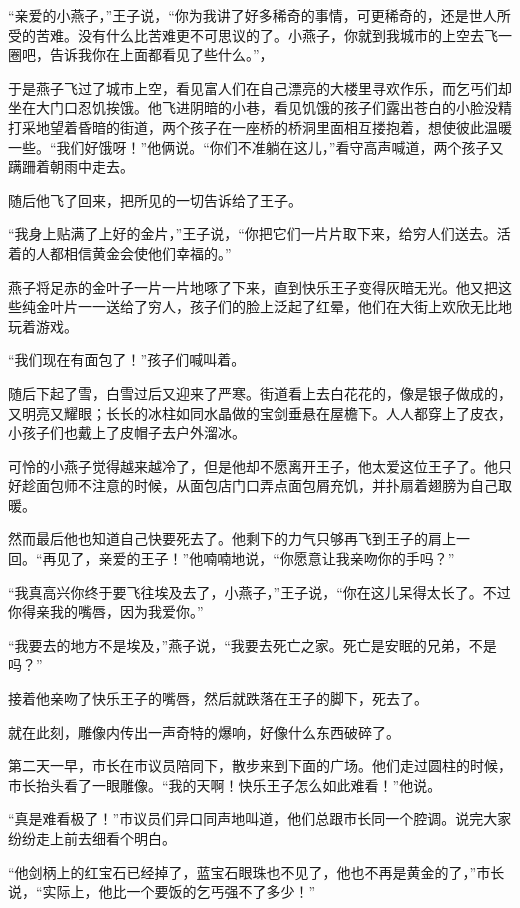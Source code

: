 \documentclass[12pt,UTF-8,openany]{ctexbook}
\begin{document}
\begin{normalsize}
    “亲爱的小燕子，”王子说，“你为我讲了好多稀奇的事情，可更稀奇的，还是世人所受的苦难。没有什么比苦难更不可思议的了。小燕子，你就到我城市的上空去飞一圈吧，告诉我你在上面都看见了些什么。”，
    
    于是燕子飞过了城市上空，看见富人们在自己漂亮的大楼里寻欢作乐，而乞丐们却坐在大门口忍饥挨饿。他飞进阴暗的小巷，看见饥饿的孩子们露出苍白的小脸没精打采地望着昏暗的街道，两个孩子在一座桥的桥洞里面相互搂抱着，想使彼此温暖一些。“我们好饿呀！”他俩说。“你们不准躺在这儿，”看守高声喊道，两个孩子又蹒跚着朝雨中走去。
    
    随后他飞了回来，把所见的一切告诉给了王子。
    
    “我身上贴满了上好的金片，”王子说，“你把它们一片片取下来，给穷人们送去。活着的人都相信黄金会使他们幸福的。”
    
    燕子将足赤的金叶子一片一片地啄了下来，直到快乐王子变得灰暗无光。他又把这些纯金叶片一一送给了穷人，孩子们的脸上泛起了红晕，他们在大街上欢欣无比地玩着游戏。
    
    “我们现在有面包了！”孩子们喊叫着。
    
    随后下起了雪，白雪过后又迎来了严寒。街道看上去白花花的，像是银子做成的，又明亮又耀眼；长长的冰柱如同水晶做的宝剑垂悬在屋檐下。人人都穿上了皮衣，小孩子们也戴上了皮帽子去户外溜冰。
    
    可怜的小燕子觉得越来越冷了，但是他却不愿离开王子，他太爱这位王子了。他只好趁面包师不注意的时候，从面包店门口弄点面包屑充饥，并扑扇着翅膀为自己取暖。
    
    然而最后他也知道自己快要死去了。他剩下的力气只够再飞到王子的肩上一回。“再见了，亲爱的王子！”他喃喃地说，“你愿意让我亲吻你的手吗？”
    
    “我真高兴你终于要飞往埃及去了，小燕子，”王子说，“你在这儿呆得太长了。不过你得亲我的嘴唇，因为我爱你。”
    
    “我要去的地方不是埃及，”燕子说，“我要去死亡之家。死亡是安眠的兄弟，不是吗？”
    
    接着他亲吻了快乐王子的嘴唇，然后就跌落在王子的脚下，死去了。
    
    就在此刻，雕像内传出一声奇特的爆响，好像什么东西破碎了。
    
    第二天一早，市长在市议员陪同下，散步来到下面的广场。他们走过圆柱的时候，市长抬头看了一眼雕像。“我的天啊！快乐王子怎么如此难看！”他说。
    
    “真是难看极了！”市议员们异口同声地叫道，他们总跟市长同一个腔调。说完大家纷纷走上前去细看个明白。
    
    “他剑柄上的红宝石已经掉了，蓝宝石眼珠也不见了，他也不再是黄金的了，”市长说，“实际上，他比一个要饭的乞丐强不了多少！”
    

\end{normalsize}
\end{document}
